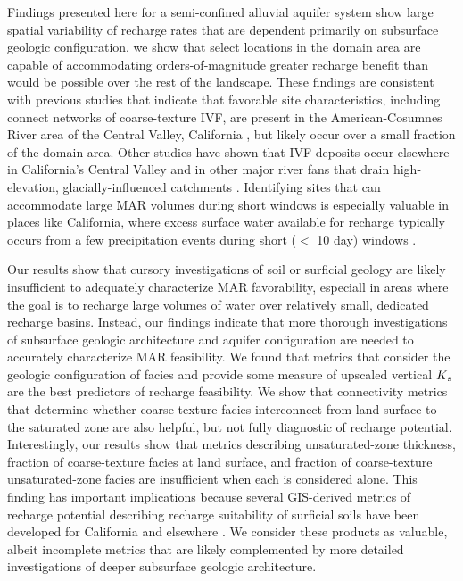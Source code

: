 Findings presented here for a semi-confined alluvial aquifer system show large spatial variability of recharge rates that are dependent primarily on subsurface geologic configuration. we show that select locations in the domain area are capable of accommodating orders-of-magnitude greater recharge benefit than would be possible over the rest of the landscape. These findings are consistent with previous studies that indicate that favorable site characteristics, including connect networks of coarse-texture IVF, are present in the American-Cosumnes River area of the Central Valley, California \citep{meirovitz2010thesis,maples_2019}, but likely occur over a small fraction of the domain area. Other studies have shown that IVF deposits occur elsewhere in California's Central Valley \citep[e.g.,][]{weissmann2005factors} and in other major river fans that drain high-elevation, glacially-influenced catchments \citep[e.g.,][]{pierce1983pleistocene}. Identifying sites that can accommodate large MAR volumes during short windows is especially valuable in places like California, where excess surface water available for recharge typically occurs from a few precipitation events \citep{dettinger2011atmospheric} during short ($<$ 10 day) windows \citep{kocis2017availability}. 

Our results show that cursory investigations of soil or surficial geology are likely insufficient to adequately characterize MAR favorability, especiall in areas where the goal is to recharge large volumes of water over relatively small, dedicated recharge basins. Instead, our findings indicate that more thorough investigations of subsurface geologic architecture and aquifer configuration are needed to accurately characterize MAR feasibility. We found that metrics that consider the geologic configuration of facies and provide some measure of upscaled vertical $K\textsubscript{s}$ are the best predictors of recharge feasibility. We show that connectivity metrics that determine whether coarse-texture facies interconnect from land surface to the saturated zone are also helpful, but not fully diagnostic of recharge potential. Interestingly, our results show that metrics describing unsaturated-zone thickness, fraction of coarse-texture facies at land surface, and fraction of coarse-texture unsaturated-zone facies are insufficient when each is considered alone. This finding has important implications because several GIS-derived metrics of recharge potential describing recharge suitability of surficial soils have been developed for California and elsewhere \citep{ogeen2015sagbi,adham2010study,ghayoumian2007application}. We consider these products as valuable, albeit incomplete metrics that are likely complemented by more detailed investigations of deeper subsurface geologic architecture. 


